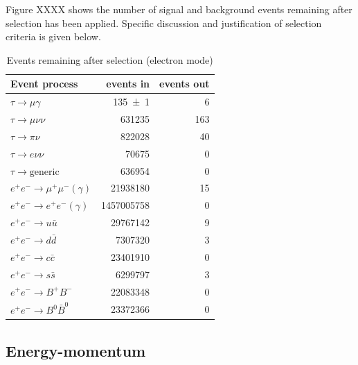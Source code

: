 \documentclass[12pt]{thesis}  %
\begin{document}
Figure XXXX shows the number of signal and background events remaining after selection has been applied. Specific discussion and justification of selection criteria is given below.

\begin{table}[h]
\centering
\begin{tabular}{lrr}
\textbf{Event process}         & \textbf{events in} & \textbf{events out} \\ \hline 
\rowcolor[HTML]{EFEFEF} 
$\tau\to\mu\gamma$       & \num{135 \pm 1}        & 6                             \\
$\tau\to\mu\nu\nu$      & \num{631235}             & 163                    \\
$\tau\to\pi\nu$         & \num{822028}                & 40                                     \\
$\tau\to e\nu\nu$       & \num   {70675}              & 0                                  \\
$\tau\to\text{generic}$  & \num{636954}           & 0                                   \\
$e^+ e^- \to \mu^+ \mu^- (\gamma)$       & \num{21938180}        & 15             \\
$e^+ e^- \to e^+ e^- (\gamma)$      & \num{1457005758}      & 0                               \\
$e^+ e^- \to u \bar{u}$       & \num{29767142}           & 9                                 \\
$e^+ e^- \to d \bar{d}$        & \num{7307320}           & 3                                \\
$e^+ e^- \to c \bar{c}$        & \num{23401910}           & 0                            \\
$e^+ e^- \to s \bar{s}$       & \num{6299797}           & 3                                       \\
$e^+ e^- \to B^+ B^-$     & \num{22083348}           & 0                            \\
$e^+ e^- \to B^0 \bar{B}^0$       & \num{23372366}           & 0                           
\end{tabular}
\caption{Events remaining after selection (electron mode)}
\label{my-label}
\end{table}

\subsection{Energy-momentum}
\end{document}
